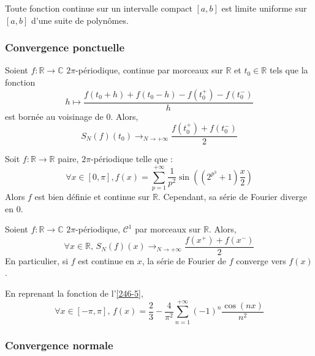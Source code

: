 
	\begin{application}
		Toute fonction continue sur un intervalle compact $[a,b]$ est limite uniforme sur $[a,b]$ d'une suite de polynômes.
	\end{application}

	\subsubsection{Convergence ponctuelle}


	\begin{theorem}[Dirichlet]
		Soient $f : \mathbb{R} \rightarrow \mathbb{C}$ $2\pi$-périodique, continue par morceaux sur $\mathbb{R}$ et $t_0 \in \mathbb{R}$ tels que la fonction
		\[ h \mapsto \frac{f(t_0 + h) + f(t_0 - h) - f(t_0^+) - f(t_0^-)}{h} \]
		est bornée au voisinage de $0$. Alors,
		\[ S_N(f)(t_0) \longrightarrow_{N \rightarrow +\infty} \frac{f(t_0^+) + f(t_0^-)}{2} \]
	\end{theorem}

	\begin{cexample}
		Soit $f : \mathbb{R} \rightarrow \mathbb{R}$ paire, $2\pi$-périodique telle que :
		\[ \forall x \in [0, \pi], f(x) = \sum_{p=1}^{+\infty} \frac{1}{p^2} \sin \left( (2^{p^3} + 1) \frac{x}{2} \right)
		\]
		Alors $f$ est bien définie et continue sur $\mathbb{R}$. Cependant, sa série de Fourier diverge en $0$.
	\end{cexample}

	\begin{corollary}
		Soient $f : \mathbb{R} \rightarrow \mathbb{C}$ $2\pi$-périodique, $\mathcal{C}^1$ par morceaux sur $\mathbb{R}$. Alors,
		\[ \forall x \in \mathbb{R}, \, S_N(f)(x) \longrightarrow_{N \rightarrow +\infty} \frac{f(x^+) + f(x^-)}{2} \]
		En particulier, si $f$ est continue en $x$, la série de Fourier de $f$ converge vers $f(x)$.
	\end{corollary}

	\begin{example}
		\label{246-6}
		En reprenant la fonction de l'\cref{246-5},
		\[ \forall x \in [-\pi, \pi], \, f(x) = \frac{2}{3} - \frac{4}{\pi^2} \sum_{n=1}^{+\infty} (-1)^n \frac{\cos(nx)}{n^2} \]
	\end{example}

	\subsubsection{Convergence normale}

